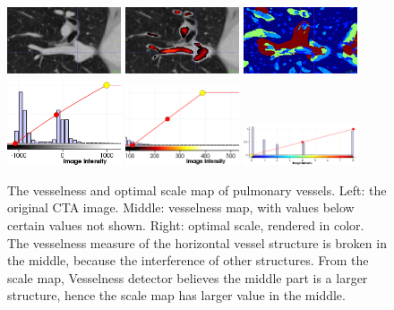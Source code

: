 \documentclass[12pt]{article}
\begin{document}
\begin{figure}[htb]
  \includegraphics[width=0.3\textwidth]{figures/vesselness/cta}
  \includegraphics[width=0.3\textwidth]{figures/vesselness/vesselness}
  \includegraphics[width=0.3\textwidth]{figures/vesselness/scale}\\
  \includegraphics[width=0.3\textwidth]{figures/vesselness/cta_colormap}
  \includegraphics[width=0.3\textwidth]{figures/vesselness/vesselness_colormap}
  \includegraphics[width=0.3\textwidth]{figures/vesselness/scale_colormap}
  \caption{The vesselness and optimal scale map of pulmonary vessels. Left:
    the original CTA image. Middle: vesselness map, with values below certain
    values not shown. Right: optimal scale, rendered in color. The vesselness
    measure of the horizontal vessel structure is broken in the middle,
    because the interference of other structures. From the scale map,
    Vesselness detector believes the middle part is a larger structure, hence
    the scale map has larger value in the middle. }
\end{figure}
\end{document}
